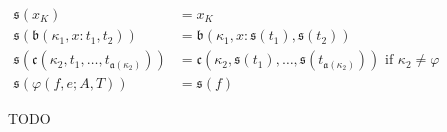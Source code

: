 
\begin{figure}
    \centering
    \begin{align*}
        \mathfrak{s}(x_K) &= x_K \\
        \mathfrak{s}(\mathfrak{b}(\kappa_1, x : t_1, t_2)) &= \mathfrak{b}(\kappa_1, x : \mathfrak{s}(t_1), \mathfrak{s}(t_2)) \\
        \mathfrak{s}(\mathfrak{c}(\kappa_2, t_1, \ldots, t_{\mathfrak{a}(\kappa_2)})) &= \mathfrak{c}(\kappa_2, \mathfrak{s}(t_1), \ldots, \mathfrak{s}(t_{\mathfrak{a}(\kappa_2)})) \text{ if }\kappa_2 \neq \varphi \\
        \mathfrak{s}(\varphi(f, e; A, T)) &= \mathfrak{s}(f)
    \end{align*}
    \caption{TODO}
    \label{fig:5:context-project}
\end{figure}

